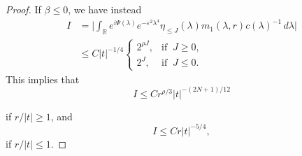 \documentclass[10pt,leqno]{amsart}
\numberwithin{equation}{section}
\newcommand{\field}[1]{\mathbb{#1}}
\newcommand{\R}{\field{R}}          		%
\begin{document}
\begin{proof}
If $\beta\le 0$, we have instead
\begin{align*}
I &=\Big|\int_\R e^{i\Psi(\lambda)}e^{-\varepsilon^2 \lambda^4} \eta_{\leq J}(\lambda) m_1 (\lambda ,r) c(\lambda )^{-1}\, d\lambda\Big|\\
&\leq C  |t|^{-1/4} 
\begin{cases} 2^{\rho J},&\mbox{if }\  J\geq 0,\\ 
2^J ,&\mbox{if }\  J\leq 0 . \end{cases}
 \end{align*}
This implies that
\begin{equation}
\label{1412e3}
I\le Cr^{\rho/3}|t|^{-(2N+1)/12}
\end{equation}

if $r/|t|\geq 1$, and
\begin{equation}
\label{1412e4}
I\leq C  r|t|^{-5/4}, 
\end{equation}
if $r/|t| \leq 1$.


\end{proof}
\end{document}
